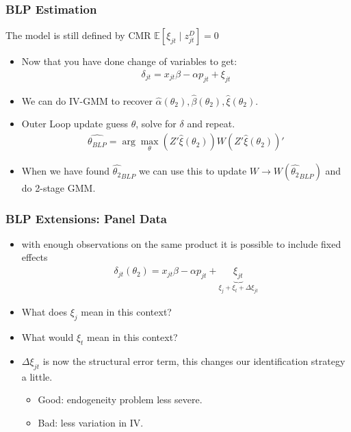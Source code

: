  \begin{frame}
\frametitle{BLP Estimation}
The model is still defined by CMR $\mathbb{E}[\xi_{jt} \mid  z_{jt}^D]=0$
\begin{itemize}
 \item Now that you have done change of variables to get:
 \begin{align*}
\delta_{jt}= x_{jt} \beta -\alpha p_{jt}+  \xi_{jt}
 \end{align*}
 \item We can do IV-GMM to recover $\hat{\alpha}(\theta_2),\widehat{\beta}(\theta_2),\widehat{\xi}(\theta_2)$.
 \item Outer Loop update guess $\theta$, solve for $\delta$ and repeat.
 \begin{align*}
 \widehat{\theta_{BLP}} = \arg \max_{\theta} (Z' \widehat{\xi}(\theta_2)) W  (Z' \widehat{\xi}(\theta_2))'
 \end{align*}
 \item When we have found $\widehat{\theta_2}_{BLP}$ we can use this to update $W \rightarrow W(\widehat{\theta_2}_{BLP})$ and do 2-stage GMM.
 \end{itemize}
\end{frame}



\begin{frame}
\frametitle{BLP Extensions: Panel Data}
\begin{itemize}
\item with enough observations on the same product it is possible to include fixed effects
\begin{align*}
\delta_{jt}(\theta_2) = x_{jt} \beta - \alpha p_{jt} + \underbrace{\xi_{jt}}_{\xi_{j} + \xi_t + \Delta \xi_{jt}}
\end{align*}
\item What does $\xi_{j}$ mean in this context?
\item What would $\xi_t$ mean in this context?
\item $\Delta \xi_{jt}$ is now the structural error term, this changes our identification strategy a little. 
\begin{itemize}
\item Good: endogeneity problem less severe.
\item Bad: less variation in IV.
\end{itemize}
\end{itemize}
\end{frame}


